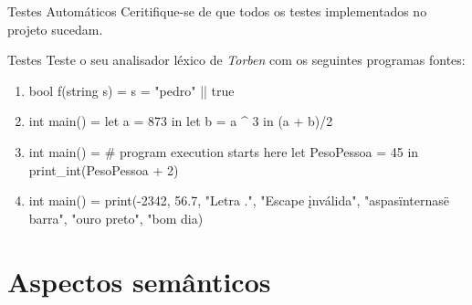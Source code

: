 \documentclass[a4paper,10pt,brazil]{article}
\newcommand{\lang}{\textsl{Torben}}
\begin{document}
\begin{task}[breakable]{Testes Automáticos}{}
  Ceritifique-se de que todos os testes implementados no projeto
  sucedam.
\end{task}

\begin{task}[breakable]{Testes}{}
  Teste o seu analisador léxico de \lang{} com os seguintes programas
  fontes:
  \begin{enumerate}
    \item 
\begin{pygmented}[lang=text]
bool f(string s) =
  s = "pedro" || true
\end{pygmented}

    \item 
\begin{pygmented}[lang=text]
int main() =
  let a = 873 in
    let b = a ^ 3 in
      (a + b)/2
\end{pygmented}

    \item 
\begin{pygmented}[lang=text]
int main() =
  # program execution starts here
  let PesoPessoa = 45 in
    print_int(PesoPessoa + 2)
\end{pygmented}

    \item 
\begin{pygmented}[lang=text]
int main() =
  print(-2342,
        56.7,
        "Letra .",
        "Escape \k inválida",
        "aspas\"internas\" e \\ barra",
        "ouro \n preto",
        "bom dia)
\end{pygmented}
  \end{enumerate}
\end{task}


\section{Aspectos semânticos}
\end{document}
